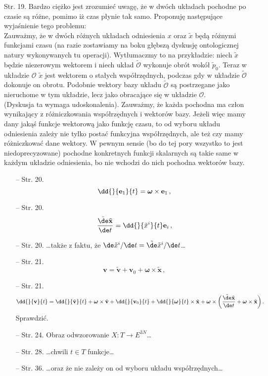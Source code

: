 \documentclass[a4paper,11pt]{article}
\begin{document}
\start Str. 19. Bardzo ciężko jest zrozumieć uwagę, że w dwóch układach pochodne po czasie są różne, pomimo iż czas płynie tak samo. Proponuję następujące wyjaśnienie tego problemu: \\
Zauważmy, że w dwóch różnych układach odniesienia $x$ oraz
$\tilde{ x }$ będą różnymi funkcjami czasu (na razie zostawiamy na
boku głębszą dyskusję ontologicznej natury wykonywanych tu operacji).
Wytłumaczmy to na przykładzie: niech $\tilde{ x }$ będzie niezerowym
wektorem i niech układ $\tilde{ \mathcal{ O } }$ wykonuje obrót wokół
$\tilde{ p }_{ 0 }$. Teraz w układzie $\mathcal{ O }$ $\tilde{ x }$
jest wektorem o stałych współrzędnych, podczas gdy w układzie
$\tilde{ \mathcal{ O } }$ dokonuje on obrotu. Podobnie wektory bazy
układu $\tilde{ \mathcal{ O } }$ są postrzegane jako nieruchome w tym
układzie, lecz jako obracające się w
układzie $\mathcal{ O }$. \\
(Dyskusja ta wymaga udoskonalenia). Zauważmy, że każda pochodna ma
człon wynikający z różniczkowania współrzędnych i wektorów bazy.
Jeżeli więc mamy dany jakąś funkcje wektorową jako funkcję czasu, to
od wyboru układu odniesienia zależy nie tylko postać funkcyjna
współrzędnych, ale też czy mamy różniczkować dane wektory. W pewnym
sensie (bo do tej pory wszystko to jest niedoprecyzowane) pochodne
konkretnych funkcji skalarnych są takie same w każdym układzie
odniesienia, bo nie wchodzi do nich pochodna wektorów bazy.



\begin{itemize}
\item[--] Str. 20.
  $$\dd{}{ \mathbf{ e }_{ 1 } }{ t } = \boldsymbol{ \omega } \times
  \bold{ e }_{ 1 } \, ,$$
\item[--] Str. 20.
  $$\frac{ \tilde{ \de } \tilde{ \mathbf{ x } } }{ \de t } = \dd{}{
    \tilde{ x }^{ i }}{ t } \mathbf{ e }_{ i } \, ,$$
\item[--] Str. 20. \ldots także z faktu, że
  $\de \tilde{ x }^{ i } / \de t = \tilde{ \de } \tilde{ x }^{ i } /
  \de t$\ldots
\item[--] Str. 21.
  $$\mathbf{ v } = \tilde{ \mathbf{ v } } + \mathbf{ v }_{ 0 } +
  \boldsymbol{ \omega } \times \tilde{ \mathbf{ x } } \, ,$$
\item[--] Str. 21.
  $$\dd{}{ \mathbf{ v } }{ t } = \dd{}{ \tilde{ \mathbf{ v } } }{ t }
  + \boldsymbol{ \omega } \times \tilde{ \mathbf{ v } } + \dd{}{
    \mathbf{ v }_{ 0 } }{ t } + \dd{}{ \boldsymbol{ \omega } }{ t }
  \times \tilde{ \bold{ x } } + \boldsymbol{ \omega } \times \bigg(
  \frac{ \tilde{ \de } \tilde{ \bold{ x } } }{ \de t } + \boldsymbol{
    \omega } \times \tilde{ \bold{ x } } \bigg) \, .$$ Sprawdzić.
\item[--] Str. 24. Obraz odwzorowanie
  $X : T \rightarrow E^{ 3N }$\ldots
\item[--] Str. 28. \ldots chwili $t \in T$ funkcje\ldots
\item[--] Str. 36. \ldots oraz że nie zależy on od wyboru układu
  współrzędnych\ldots
\end{itemize}
\end{document}
